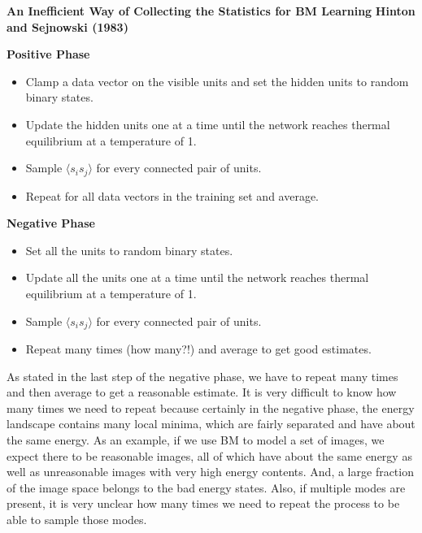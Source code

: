 \documentclass{article}
\begin{document}
\begin{center}
\textbf{An Inefficient Way of Collecting the Statistics for BM Learning} \newline
\textbf{Hinton and Sejnowski (1983)}
\end{center}
\begin{multicols}{2}
\begin{center}
\textbf{Positive Phase}
\end{center}
\begin{itemize}
	\item Clamp a data vector on the visible units and set the hidden units to random binary states.
	\item Update the hidden units one at a time until the network reaches thermal equilibrium at a temperature of 1.
	\item Sample $\langle s_i s_j \rangle$ for every connected pair of units.
	\item Repeat for all data vectors in the training set and average.
\end{itemize}
\columnbreak
\begin{center}
\textbf{Negative Phase}
\end{center}
\begin{itemize}
	\item Set all the units to random binary states.
	\item Update all the units one at a time until the network reaches thermal equilibrium at a temperature of 1.
	\item Sample $\langle s_i s_j \rangle$ for every connected pair of units.
	\item Repeat many times (how many?!) and average to get good estimates.
\end{itemize}
\end{multicols}

As stated in the last step of the negative phase, we have to repeat many times and then average to get a reasonable estimate. It is very difficult to know how many times we need to repeat because certainly in the negative phase, the energy landscape contains many local minima, which are fairly separated and have about the same energy. As an example, if we use BM to model a set of images, we expect there to be reasonable images, all of which have about the same energy as well as unreasonable images with very high energy contents. And, a large fraction of the image space belongs to the bad energy states. Also, if multiple modes are present, it is very unclear how many times we need to repeat the process to be able to sample those modes.
\end{document}
